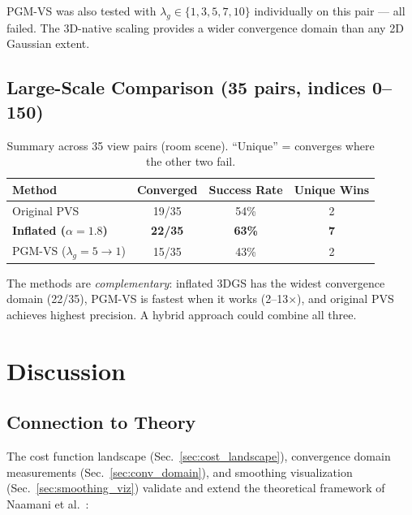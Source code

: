 \documentclass[11pt]{article}
\begin{document}
PGM-VS was also tested with $\lambda_g \in \{1, 3, 5, 7, 10\}$ individually on this pair --- all failed. The 3D-native scaling provides a wider convergence domain than any 2D Gaussian extent.

\subsection{Large-Scale Comparison (35 pairs, indices 0--150)}

\begin{table}[h!]
\centering
\caption{Summary across 35 view pairs (room scene). ``Unique'' = converges where the other two fail.}
\label{tab:35pairs}
\begin{tabular}{lccc}
\toprule
\textbf{Method} & \textbf{Converged} & \textbf{Success Rate} & \textbf{Unique Wins} \\
\midrule
Original PVS & 19/35 & 54\% & 2 \\
\textbf{Inflated ($\alpha=1.8$)} & \textbf{22/35} & \textbf{63\%} & \textbf{7} \\
PGM-VS ($\lambda_g = 5 \to 1$) & 15/35 & 43\% & 2 \\
\bottomrule
\end{tabular}
\end{table}

The methods are \emph{complementary}: inflated 3DGS has the widest convergence domain (22/35), PGM-VS is fastest when it works (2--13$\times$), and original PVS achieves highest precision. A hybrid approach could combine all three.


\section{Discussion}
\label{sec:discussion}

\subsection{Connection to Theory}

The cost function landscape (Sec.~\ref{sec:cost_landscape}), convergence domain measurements (Sec.~\ref{sec:conv_domain}), and smoothing visualization (Sec.~\ref{sec:smoothing_viz}) validate and extend the theoretical framework of Naamani et al.~\cite{naamani2024iros}:
\end{document}
